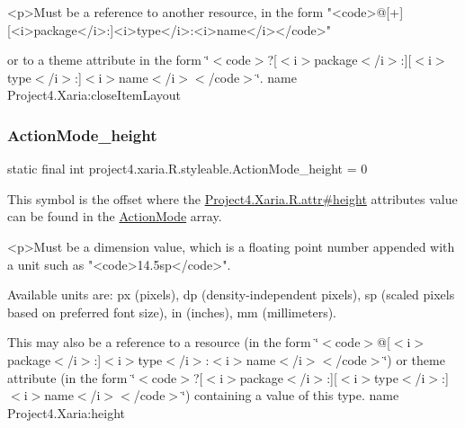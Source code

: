\begin{DoxyVerb}      <p>Must be a reference to another resource, in the form "<code>@[+][<i>package</i>:]<i>type</i>:<i>name</i></code>"
\end{DoxyVerb}
 or to a theme attribute in the form \char`\"{}$<$code$>$?\mbox{[}$<$i$>$package$<$/i$>$\+:\mbox{]}\mbox{[}$<$i$>$type$<$/i$>$\+:\mbox{]}$<$i$>$name$<$/i$>$$<$/code$>$\char`\"{}.  name Project4.\+Xaria\+:close\+Item\+Layout \mbox{\label{classproject4_1_1xaria_1_1R_1_1styleable_a7ca5db9c9a43d5a29fd3ede3ad0266cd}} 
\subsubsection{\texorpdfstring{Action\+Mode\+\_\+height}{ActionMode\_height}}
{\footnotesize\ttfamily static final int project4.\+xaria.\+R.\+styleable.\+Action\+Mode\+\_\+height = 0\hspace{0.3cm}{\ttfamily [static]}}

This symbol is the offset where the \hyperlink{}{Project4.\+Xaria.\+R.\+attr\#height} attribute\textquotesingle{}s value can be found in the \hyperlink{classproject4_1_1xaria_1_1R_1_1styleable_af9c7aa13148c68a1e3b75f513d014daa}{Action\+Mode} array.

\begin{DoxyVerb}      <p>Must be a dimension value, which is a floating point number appended with a unit such as "<code>14.5sp</code>".
\end{DoxyVerb}
 Available units are\+: px (pixels), dp (density-\/independent pixels), sp (scaled pixels based on preferred font size), in (inches), mm (millimeters). 

This may also be a reference to a resource (in the form \char`\"{}$<$code$>$@\mbox{[}$<$i$>$package$<$/i$>$\+:\mbox{]}$<$i$>$type$<$/i$>$\+:$<$i$>$name$<$/i$>$$<$/code$>$\char`\"{}) or theme attribute (in the form \char`\"{}$<$code$>$?\mbox{[}$<$i$>$package$<$/i$>$\+:\mbox{]}\mbox{[}$<$i$>$type$<$/i$>$\+:\mbox{]}$<$i$>$name$<$/i$>$$<$/code$>$\char`\"{}) containing a value of this type.  name Project4.\+Xaria\+:height \mbox{\label{classproject4_1_1xaria_1_1R_1_1styleable_a1883dbad4265d780ae2a5d8c6b695982}} 
